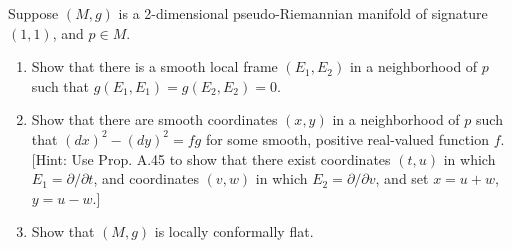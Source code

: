 \begin{exercise}
\label{prob:pseudo-riemannian-2d}
Suppose $(M, g)$ is a 2-dimensional pseudo-Riemannian manifold of signature $(1, 1)$, and $p \in M$.
\begin{enumerate}
\item[(a)] Show that there is a smooth local frame $(E_1, E_2)$ in a neighborhood of $p$ such that $g(E_1, E_1) = g(E_2, E_2) = 0$.
\item[(b)] Show that there are smooth coordinates $(x, y)$ in a neighborhood of $p$ such that $(dx)^2 - (dy)^2 = fg$ for some smooth, positive real-valued function $f$. [Hint: Use Prop. A.45 to show that there exist coordinates $(t,u)$ in which $E_1 = \partial/\partial t$, and coordinates $(v,w)$ in which $E_2 = \partial/\partial v$, and set $x = u + w$, $y = u - w$.]
\item[(c)] Show that $(M, g)$ is locally conformally flat.
\end{enumerate}
\end{exercise}

